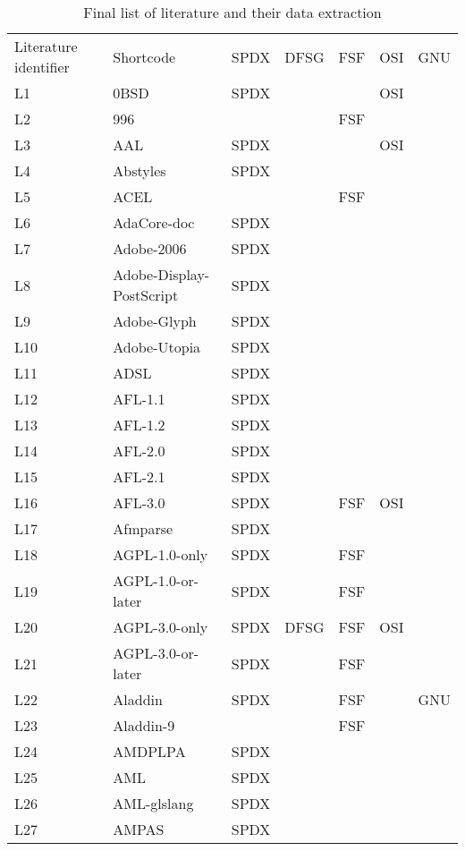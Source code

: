 
\begin{longtable}[h]{m{2cm} | m{7cm} | c | c | c | c | c}
  \caption{Final list of literature and their data extraction} \label{table:appendix:c} \\
  \hline
  Literature identifier & Shortcode & SPDX & DFSG & FSF & OSI & GNU \\
L1 & 0BSD & SPDX &  &  & OSI &  \\
L2 & 996 &  &  & FSF &  &  \\
L3 & AAL & SPDX &  &  & OSI &  \\
L4 & Abstyles & SPDX &  &  &  &  \\
L5 & ACEL &  &  & FSF &  &  \\
L6 & AdaCore-doc & SPDX &  &  &  &  \\
L7 & Adobe-2006 & SPDX &  &  &  &  \\
L8 & Adobe-Display-PostScript & SPDX &  &  &  &  \\
L9 & Adobe-Glyph & SPDX &  &  &  &  \\
L10 & Adobe-Utopia & SPDX &  &  &  &  \\
L11 & ADSL & SPDX &  &  &  &  \\
L12 & AFL-1.1 & SPDX &  &  &  &  \\
L13 & AFL-1.2 & SPDX &  &  &  &  \\
L14 & AFL-2.0 & SPDX &  &  &  &  \\
L15 & AFL-2.1 & SPDX &  &  &  &  \\
L16 & AFL-3.0 & SPDX &  & FSF & OSI &  \\
L17 & Afmparse & SPDX &  &  &  &  \\
L18 & AGPL-1.0-only & SPDX &  & FSF &  &  \\
L19 & AGPL-1.0-or-later & SPDX &  & FSF &  &  \\
L20 & AGPL-3.0-only & SPDX & DFSG & FSF & OSI &  \\
L21 & AGPL-3.0-or-later & SPDX &  & FSF &  &  \\
L22 & Aladdin & SPDX &  & FSF &  & GNU \\
L23 & Aladdin-9 &  &  & FSF &  &  \\
L24 & AMDPLPA & SPDX &  &  &  &  \\
L25 & AML & SPDX &  &  &  &  \\
L26 & AML-glslang & SPDX &  &  &  &  \\
L27 & AMPAS & SPDX &  &  &  &  \\

\end{longtable}
